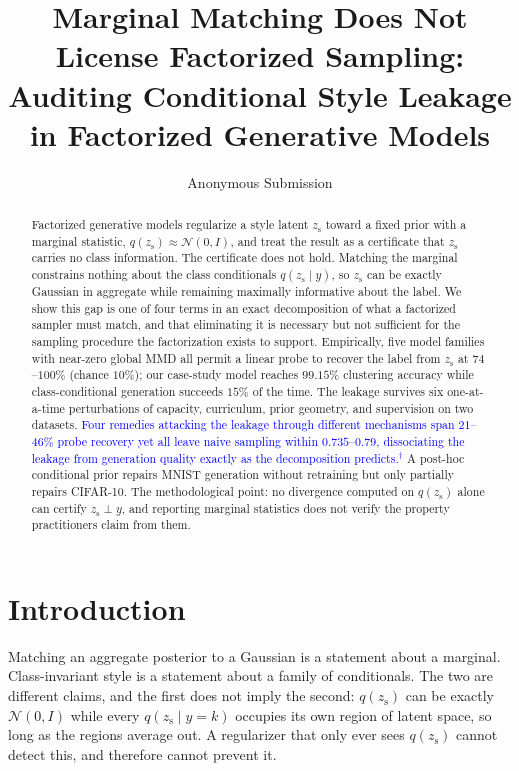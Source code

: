 \documentclass[letterpaper]{article} %
\title{Marginal Matching Does Not License Factorized Sampling:\\
Auditing Conditional Style Leakage in Factorized Generative Models}
\author{Anonymous Submission}
\newcommand{\pj}[1]{\textcolor{blue}{#1$^{\dagger}$}}
\newcommand{\zs}{z_{\mathrm{s}}}
\begin{document}
\maketitle

\begin{abstract}
Factorized generative models regularize a style latent $\zs$ toward a fixed
prior with a marginal statistic, $q(\zs)\approx\mathcal N(0,I)$, and treat
the result as a certificate that $\zs$ carries no class information. The
certificate does not hold. Matching the marginal constrains nothing about
the class conditionals $q(\zs\mid y)$, so $\zs$ can be exactly Gaussian in
aggregate while remaining maximally informative about the label. We show
this gap is one of four terms in an exact decomposition of what a factorized
sampler must match, and that eliminating it is necessary but not sufficient
for the sampling procedure the factorization exists to support. Empirically,
five model families with near-zero global MMD all permit a linear probe to
recover the label from $\zs$ at $74$--$100\%$ (chance $10\%$); our case-study
model reaches $99.15\%$ clustering accuracy while class-conditional
generation succeeds $15\%$ of the time. The leakage survives six
one-at-a-time perturbations of capacity, curriculum, prior geometry, and
supervision on two datasets. \pj{Four remedies attacking the leakage through
different mechanisms span $21$--$46\%$ probe recovery yet all leave naive
sampling within $0.735$--$0.79$, dissociating the leakage from generation
quality exactly as the decomposition predicts.} A post-hoc conditional prior
repairs MNIST generation without retraining but only partially repairs
CIFAR-10. The methodological point: no divergence computed on $q(\zs)$ alone
can certify $\zs\perp y$, and reporting marginal statistics does not verify
the property practitioners claim from them.
\end{abstract}

\section{Introduction}
\label{sec:intro}

Matching an aggregate posterior to a Gaussian is a statement about a
marginal. Class-invariant style is a statement about a family of
conditionals. The two are different claims, and the first does not imply the
second: $q(\zs)$ can be exactly $\mathcal N(0,I)$ while every $q(\zs\mid
y{=}k)$ occupies its own region of latent space, so long as the regions
average out. A regularizer that only ever sees $q(\zs)$ cannot detect this,
and therefore cannot prevent it.
\end{document}
